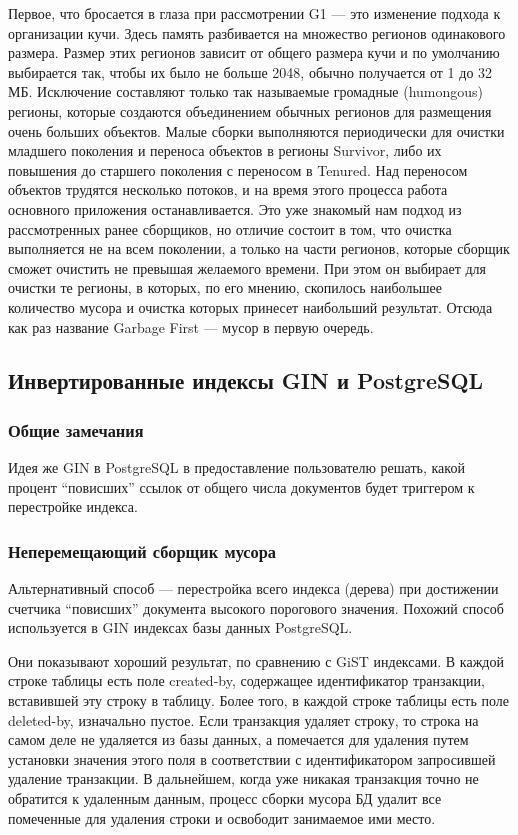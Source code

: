 Первое, что бросается в глаза при рассмотрении G1 — это изменение подхода к организации кучи.
Здесь память разбивается на множество регионов одинакового размера. Размер этих регионов зависит
от общего размера кучи и по умолчанию выбирается так, чтобы их было не больше 2048,
обычно получается от 1 до 32 МБ. Исключение составляют только так называемые громадные (humongous)
регионы, которые создаются объединением обычных регионов для размещения очень больших объектов.
Малые сборки выполняются периодически для очистки младшего поколения и переноса объектов
в регионы Survivor, либо их повышения до старшего поколения с переносом в Tenured.
Над переносом объектов трудятся несколько потоков, и на время этого процесса работа основного
приложения останавливается. Это уже знакомый нам подход из рассмотренных ранее сборщиков,
но отличие состоит в том, что очистка выполняется не на всем поколении, а только на части регионов,
которые сборщик сможет очистить не превышая желаемого времени. При этом он выбирает для очистки те регионы,
в которых, по его мнению, скопилось наибольшее количество мусора и очистка которых принесет наибольший результат.
Отсюда как раз название Garbage First — мусор в первую очередь.

\subsection{Инвертированные индексы GIN и PostgreSQL}

\subsubsection{Общие замечания}

Идея же GIN в PostgreSQL в предоставление пользователю решать, какой процент “повисших” ссылок
от общего числа документов будет триггером к перестройке индекса. 

\subsubsection{Неперемещающий сборщик мусора}

Альтернативный способ — перестройка всего индекса (дерева) при достижении счетчика “повисших”
документа высокого порогового значения. Похожий способ используется в GIN индексах базы данных PostgreSQL.

Они показывают хороший результат, по сравнению с GiST индексами. В каждой строке таблицы есть поле
created-by, содержащее идентификатор транзакции, вставившей эту строку в таблицу. Более того, в каждой
строке таблицы есть поле deleted-by, изначально пустое. Если транзакция удаляет строку, то строка
на самом деле не удаляется из базы данных, а помечается для удаления путем установки значения этого поля
в соответствии с идентификатором запросившей удаление транзакции. В дальнейшем, когда уже никакая транзакция
точно не обратится к удаленным данным, процесс сборки мусора БД удалит все помеченные для удаления строки
и освободит занимаемое ими место.

